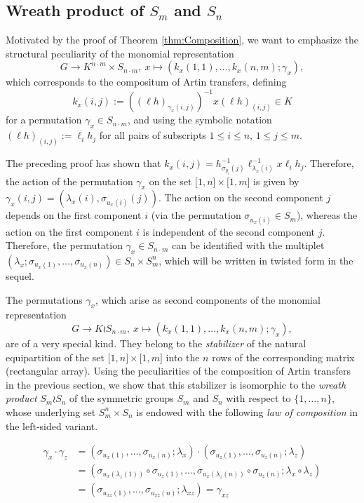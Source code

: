 \documentclass{amsart}
\theoremstyle{definition}
\numberwithin{equation}{section}
\begin{document}
\subsection{Wreath product of \(S_m\) and \(S_n\)}
\label{ss:WreathProd}

Motivated by the proof of Theorem
\ref{thm:Composition},
we want to emphasize the structural peculiarity of the monomial representation
\[G\to K^{n\cdot m}\times S_{n\cdot m},\
x\mapsto (k_x(1,1),\ldots,k_x(n,m);\gamma_x),\]
which corresponds to the compositum of Artin transfers,
defining
\[k_x(i,j):=((\ell h)_{\gamma_x(i,j)})^{-1}x(\ell h)_{(i,j)}\in K\]
for a permutation
\(\gamma_x\in S_{n\cdot m}\),
and using the symbolic notation \((\ell h)_{(i,j)}:=\ell_ih_j\)
for all pairs of subscripts \(1\le i\le n\), \(1\le j\le m\).


The preceding proof has shown that
\(k_x(i,j)=h_{\sigma_{y_i}(j)}^{-1}\ell_{\lambda_x(i)}^{-1}x\ell_ih_j\).
Therefore, the action of the permutation \(\gamma_x\) on the set
\(\lbrack 1,n\rbrack\times\lbrack 1,m\rbrack\) is given by
\(\gamma_x(i,j)=(\lambda_x(i),\sigma_{u_x(i)}(j))\).
The action on the second component \(j\) depends on the first component \(i\)
(via the permutation \(\sigma_{u_x(i)}\in S_m\)),
whereas the action on the first component \(i\) is independent of the second component \(j\).
Therefore, the permutation \(\gamma_x\in S_{n\cdot m}\) can be identified with the multiplet
\((\lambda_x;\sigma_{u_x(1)},\ldots,\sigma_{u_x(n)})\in S_n\times S_m^n\),
which will be written in twisted form in the sequel.

The permutations \(\gamma_x\), which arise as second components of the monomial representation
\[G\to K\wr S_{n\cdot m},\
x\mapsto (k_x(1,1),\ldots,k_x(n,m);\gamma_x),\]
are of a very special kind.
They belong to the \textit{stabilizer} of the natural equipartition of the set
\(\lbrack 1,n\rbrack\times\lbrack 1,m\rbrack\)
into the \(n\) rows of the corresponding matrix (rectangular array).
Using the peculiarities of the composition of Artin transfers in the previous section,
we show that this stabilizer is isomorphic to the \textit{wreath product}
\(S_m\wr S_n\) of the symmetric groups \(S_m\) and \(S_n\) with respect to \(\lbrace 1,\ldots,n\rbrace\),
whose underlying set \(S_m^n\times S_n\)
is endowed with the following \textit{law of composition}
in the left-sided variant.

\begin{equation}
\label{eqn:SmWreathSn}
\begin{aligned}
\gamma_{x}\cdot\gamma_{z}
&= (\sigma_{u_x(1)},\ldots,\sigma_{u_x(n)};\lambda_x)\cdot (\sigma_{u_z(1)},\ldots,\sigma_{u_z(n)};\lambda_z) \\
&= (\sigma_{u_x(\lambda_z(1))}\circ\sigma_{u_z(1)},\ldots,\sigma_{u_x(\lambda_z(n))}\circ\sigma_{u_z(n)};\lambda_x\circ \lambda_z) \\
&= (\sigma_{u_{xz}(1)},\ldots,\sigma_{u_{xz}(n)};\lambda_{xz})
=\gamma_{xz}
\end{aligned}
\end{equation}
\end{document}
